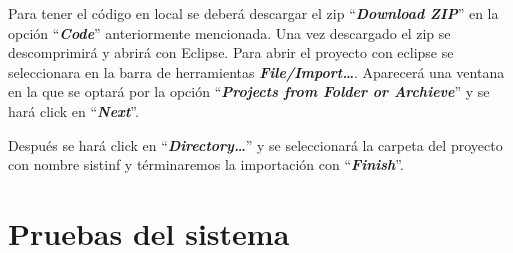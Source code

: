 
Para tener el código en local se deberá descargar el zip  ``\textbf{\textit{Download ZIP}}'' en la opción ``\textbf{\textit{Code}}'' anteriormente mencionada. Una vez descargado el zip se descomprimirá y abrirá con Eclipse. 
Para abrir el proyecto con eclipse se seleccionara en la barra de herramientas \textbf{\textit{File/Import\dots}}. Aparecerá una ventana en la que se optará por la opción ``\textbf{\textit{Projects from Folder or Archieve}}'' y se hará click en ``\textbf{\textit{Next}}''.

Después se hará click en ``\textbf{\textit{Directory\dots}}'' y se seleccionará la carpeta del proyecto con nombre sistinf y términaremos la importación con ``\textbf{\textit{Finish}}''.

\section{Pruebas del sistema}
